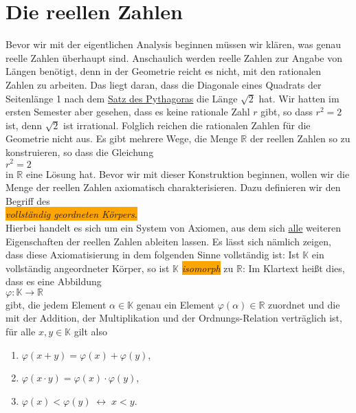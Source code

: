 \chapter{Die reellen Zahlen}
Bevor wir mit der eigentlichen Analysis beginnen m\"ussen wir kl\"aren, was genau reelle Zahlen
\"uberhaupt sind.  Anschaulich werden reelle Zahlen zur Angabe von L\"angen ben\"otigt, denn in der Geometrie
reicht es nicht, mit den rationalen Zahlen zu arbeiten.  Das liegt daran, dass die Diagonale eines
Quadrats der Seitenl\"ange 1 nach dem 
\href{http://de.wikipedia.org/wiki/Satz_des_Pythagoras}{Satz des Pythagoras} die L\"ange $\sqrt{2}$ hat.
Wir hatten im ersten Semester aber gesehen, dass es keine rationale Zahl $r$ gibt,
so dass $r^2 = 2$ ist, denn $\sqrt{2}$ ist irrational.  Folglich reichen die rationalen Zahlen f\"ur die Geometrie
nicht aus.  Es gibt mehrere Wege, die Menge $\mathbb{R}$ der reellen Zahlen so zu konstruieren, so dass die Gleichung 
\\[0.2cm]
\hspace*{1.3cm}
$r^2 = 2$
\\[0.2cm]
in $\mathbb{R}$ eine L\"osung hat.  Bevor wir mit dieser Konstruktion beginnen, wollen wir die Menge
der reellen Zahlen axiomatisch charakterisieren.  Dazu definieren wir den Begriff des
\\[0.2cm]
\hspace*{1.3cm}
\colorbox{orange}{\emph{vollst\"andig geordneten K\"orpers}.}
\\[0.2cm]
Hierbei handelt es sich um ein System von Axiomen, aus dem
sich \underline{alle} weiteren Eigenschaften der reellen Zahlen ableiten lassen.  Es l\"asst sich n\"amlich zeigen,
dass diese Axiomatisierung in dem folgenden Sinne vollst\"andig ist:
Ist $\mathbb{K}$ ein vollst\"andig angeordneter K\"orper, so ist $\mathbb{K}$ \colorbox{orange}{\emph{isomorph}} zu
$\mathbb{R}$: Im Klartext hei\ss{}t dies, dass es eine Abbildung
\\[0.2cm]
\hspace*{1.3cm}
$\varphi:\mathbb{K} \rightarrow \mathbb{R}$
\\[0.2cm]
gibt, die jedem Element $\alpha \in \mathbb{K}$ genau ein Element $\varphi(\alpha) \in \mathbb{R}$
zuordnet und die mit der Addition, der Multiplikation und der Ordnungs-Relation vertr\"aglich ist, f\"ur alle $x,y \in
\mathbb{K}$ gilt also 
\begin{enumerate}
\item $\varphi(x + y) = \varphi(x) + \varphi(y)$,
\item $\varphi(x \cdot y) = \varphi(x) \cdot \varphi(y)$,
\item $\varphi(x) < \varphi(y) \;\leftrightarrow\; x < y$.
\end{enumerate}
